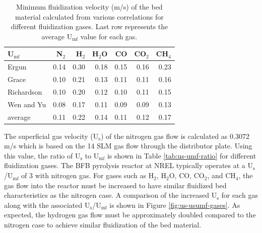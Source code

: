 \begin{table}[H]
    \centering
    \caption{Minimum fluidization velocity (m/s) of the bed material calculated from various correlations for different fluidization gases. Last row represents the average U$_\text{mf}$ value for each gas.}
    \label{tab:umf-sand}
    \begin{tabular}{lrrrrrr}
        \toprule
        U$_\text{mf}$ & N$_2$ & H$_2$ & H$_2$O & CO & CO$_2$ & CH$_4$ \\
        \midrule
        Ergun         & 0.14 & 0.30 & 0.18 & 0.15 & 0.16 & 0.23 \\
        Grace         & 0.10 & 0.21 & 0.13 & 0.11 & 0.11 & 0.16 \\
        Richardson    & 0.10 & 0.20 & 0.12 & 0.10 & 0.11 & 0.15 \\
        Wen and Yu    & 0.08 & 0.17 & 0.11 & 0.09 & 0.09 & 0.13 \\
        average       & 0.11 & 0.22 & 0.14 & 0.11 & 0.12 & 0.17 \\
        \bottomrule
    \end{tabular}
\end{table}

The superficial gas velocity (U$_\text{s}$) of the nitrogen gas flow is calculated as 0.3072 m/s which is based on the 14 SLM gas flow through the distributor plate. Using this value, the ratio of U$_\text{s}$ to U$_\text{mf}$ is shown in Table \ref{tab:us-umf-ratio} for different fluidization gases. The BFB pyrolysis reactor at NREL typically operates at a U$_\text{s}$/U$_\text{mf}$ of 3 with nitrogen gas. For gases such as H$_2$, H$_2$O, CO, CO$_2$, and CH$_4$, the gas flow into the reactor must be increased to have similar fluidized bed characteristics as the nitrogen case. A comparison of the increased U$_\text{s}$ for each gas along with the associated U$_\text{s}$/U$_\text{mf}$ is shown in Figure \ref{fig:us-usumf-gases}. As expected, the hydrogen gas flow must be approximately doubled compared to the nitrogen case to achieve similar fluidization of the bed material.

